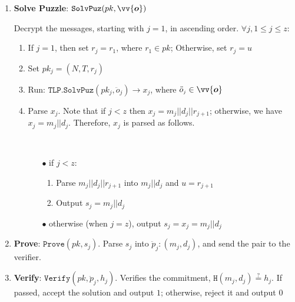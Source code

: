 \begin{enumerate}[leftmargin=.4cm]
\item\textbf{Solve Puzzle}:  $\mathtt{SolvPuz}(pk, \vv{\bm{o}})$ 

 Decrypt the messages, starting with $j=1$, in ascending order.  $\forall j, 1\leq j\leq z:$
 
\begin{enumerate}
\item If $j=1$, then set $r_{\scriptscriptstyle j}=r_{\scriptscriptstyle 1}$, where $r_{\scriptscriptstyle 1}\in pk$; Otherwise, set $r_{\scriptscriptstyle j}=u$

\item Set  $pk_{\scriptscriptstyle j}=(N,T,r_{\scriptscriptstyle j})$

\item\label{call-RTLP-SolvPuz} Run: $\mathtt{TLP.SolvPuz}(pk_{\scriptscriptstyle j},\ddot{o}_{\scriptscriptstyle j})\rightarrow x_{\scriptscriptstyle j}$, where $\ddot{o}_{\scriptscriptstyle j}\in \vv{\bm{o}}$


\item\label{Dec-message} Parse $x_{\scriptscriptstyle j}$. Note that if $j<z$ then $x_{\scriptscriptstyle j}=m_{\scriptscriptstyle j}||d_{\scriptscriptstyle j}||r_{\scriptscriptstyle j+1}$; otherwise,  we have $x_{\scriptscriptstyle j}=m_{\scriptscriptstyle j}||d_{\scriptscriptstyle j}$. Therefore, $x_{\scriptscriptstyle j}$ is parsed as follows.

\

\begin{itemize}
\item[$\bullet$] if $j<z: $
\begin{enumerate}

\item Parse $m_{\scriptscriptstyle j}||d_{\scriptscriptstyle j}||r_{\scriptscriptstyle j+1}$ into  $m_{\scriptscriptstyle j}||d_{\scriptscriptstyle j}$ and $u=r_{\scriptscriptstyle j+1}$
\item Output $s_{\scriptscriptstyle j}=m_{\scriptscriptstyle j}||d_{\scriptscriptstyle j}$
\end{enumerate}
\item[$\bullet$] otherwise (when $j=z$),  output $s_{\scriptscriptstyle j}=x_{\scriptscriptstyle j}=m_{\scriptscriptstyle j}||d_{\scriptscriptstyle j}$


\end{itemize}

\end{enumerate}

\item\label{prove-} \textbf{Prove}:  $\mathtt{Prove}(pk, s_{\scriptscriptstyle j})$. Parse  $s_{\scriptscriptstyle j}$ into $\ddot{p}_{\scriptscriptstyle j}: (m_{\scriptscriptstyle j},d_{\scriptscriptstyle j})$, and send the pair to the verifier. 
\item\label{verify-} \textbf{Verify}: $\mathtt{Verify}(pk,\ddot{p}_{\scriptscriptstyle j}, h_{\scriptscriptstyle j})$. Verifies the commitment,  $\mathtt{H}(m_{\scriptscriptstyle j},d_{\scriptscriptstyle j})\stackrel{\scriptscriptstyle?}=h_{\scriptscriptstyle j}$. If passed, accept the solution and output $1$; otherwise,  reject it and output $0$




\end{enumerate}
